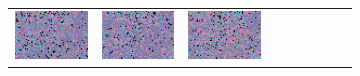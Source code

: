 \documentclass{ipol}
\begin{document}
\begin{figure}[ht]
\begin{subfigure}[t]{\linewidth}
\begin{tabular}{ccccccccc}
                \includegraphics[width=\s]{images/night/LINEAR/iso_j95_64_grids.png}&
                \includegraphics[width=\s]{images/night/PPG/iso_j95_64_grids.png}&
                \includegraphics[width=\s]{images/night/VNG/iso_j95_64_grids.png}\\

\end{tabular}
\end{subfigure}
\end{figure}
\end{document}
